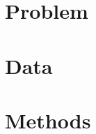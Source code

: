 \documentclass[12pt]{article}
\begin{document}

\section{Problem}



\section{Data}


\section{Methods}

\end{document}
